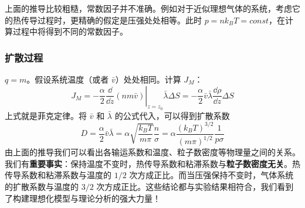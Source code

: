 上面的推导比较粗糙，常数因子并不准确。例如对于近似理想气体的系统，考虑它的热传导过程时，更精确的假定是压强处处相等。此时 $p=nk_BT=const$，在计算过程中将得到不同的常数因子。
\subsubsection{扩散过程}
$q=m$。假设系统温度（或者 $\bar v$）处处相同。计算 $J_M$：
\begin{equation}
J_M=-\frac{\alpha}{2}\left.\frac{\dd }{\dd z}(nm\bar v)\right|_{z=z_0}\bar\lambda \Delta S = -\frac{\alpha}{2}\bar v\bar\lambda \frac{\dd \rho}{\dd z}\Delta S
\end{equation}
上式就是菲克定律。将 $\bar v$ 和 $\bar\lambda$ 的公式代入，可以得到扩散系数
\begin{equation}
D=\frac{\alpha}{2}\bar v\bar \lambda = \alpha\sqrt{\frac{k_BT}{m\pi}}\frac{n}{\sigma} =  \alpha\frac{(k_B T)^{3/2}}{(m\pi)^{1/2}}\frac{1}{p\sigma}
\end{equation}
由上面的推导我们可以看出各输运系数和温度、粒子数密度等物理量之间的关系。我们有\textbf{重要事实}：保持温度不变时，热传导系数和粘滞系数与\textbf{粒子数密度无关}。热传导系数和粘滞系数与温度的 $1/2$ 次方成正比。而当压强保持不变时，气体系统的扩散系数与温度的 $3/2$ 次方成正比。这些结论都与实验结果相符合，我们看到了构建理想化模型与理论分析的强大力量！